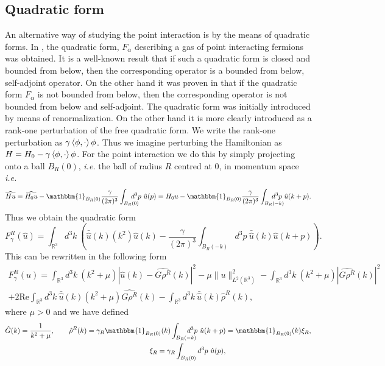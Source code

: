 \documentclass[a4paper,11pt]{article}
\newcommand{\Real}{\text{Re}}
\newcommand{\ie}{\emph{i.e.} }
\newcommand{\R}{\mathbb{R}}
\numberwithin{equation}{section}
\begin{document}
\subsection{Quadratic form}
\label{Subsection Quadratic form}
An alternative way of studying the point interaction is by the means of quadratic forms. In \cite{FINCO2012131}, the quadratic form, $ F_\alpha $ describing a gas of point interacting fermions was obtained. It is a well-known result that if such a quadratic form is closed and bounded from below, then the corresponding operator is a bounded from below, self-adjoint operator. On the other hand it was proven in \cite{FINCO2012131} that if the quadratic form $ F_\alpha $ is not bounded from below, then the corresponding operator is not bounded from below and self-adjoint. The quadratic form was initially introduced by means of renormalization. On the other hand it is more clearly introduced as a rank-one perturbation of the free quadratic form. We write the rank-one perturbation as $ \gamma\braket{\phi,\cdot}\phi $. Thus we imagine perturbing the Hamiltonian as $ H=H_0-\gamma\braket{\phi,\cdot}\phi $. For the point interaction we do this by simply projecting onto a ball $ B_R(0) $, \ie the ball of radius $ R $ centred at $ 0 $, in momentum space \ie\begin{equation}
\widehat{Hu}=\widehat{H_0u}-\mathbbm{1}_{B_R(0)}\frac{\gamma}{(2\pi)^3}\int_{B_R(0)}\!\!\!\!\!\!\!\!d^3p\ \hat{u}(p)=H_0u-\mathbbm{1}_{B_R(0)}\frac{\gamma}{(2\pi)^3}\int_{B_R(-k)}\!\!\!\!\!\!\!\!\!\!\!\! d^3p\ \hat{u}(k+p).
\end{equation}
Thus we obtain the quadratic form\begin{equation}
F^R_\gamma(\hat{u})=\int_{\R^3} d^3k\ \left(\bar{\hat{u}}(k)(k^2)\hat{u}(k)-\frac{\gamma}{(2\pi)^3}\int_{B_R(-k)}\!\!\!\!\!\!\!\!\!\!\!\! d^3p\ \bar{\hat{u}}(k) \hat{u}(k+p)\right).
\end{equation}
This can be rewritten in the following form\begin{equation}
	\begin{aligned}
	F_\gamma^R(u)=\int_{\R^3} d^3k\ \left(k^2+\mu\right)|\hat{u}(k)-\widehat{G\rho^R}(k)|^2-\mu\|u\|^2_{L^2(\R^3)}-\int_{\R^3} d^3k\ (k^2+\mu)|\widehat{G\rho^R}(k)|^2\\
	+2\Real \int_{\R^3} d^3k\ \bar{\hat{u}}(k)(k^2+\mu)\widehat{G\rho^R}(k)-\int_{\R^3} d^3k\ \bar{\hat{u}}(k)\hat{\rho}^R(k),
	\end{aligned}
\end{equation}
where $ \mu>0 $ and we have defined
\begin{equation}
\begin{aligned}
\hat{G}(k)=\frac{1}{k^2+\mu},\qquad \hat{\rho}^R(k)=\gamma_R\mathbbm{1}_{B_R(0)}(k)\int_{B_R(-k)}\!\!\!\!\!\!\!\!\!d^3p\ \hat{u}(k+p) =\mathbbm{1}_{B_R(0)}(k)\xi_R,\\
\xi_R=\gamma_R\int_{B_R(0)} d^3p\ \hat{u}(p),\qquad\qquad\qquad\qquad\qquad\qquad
\end{aligned}
\end{equation}
\end{document}
